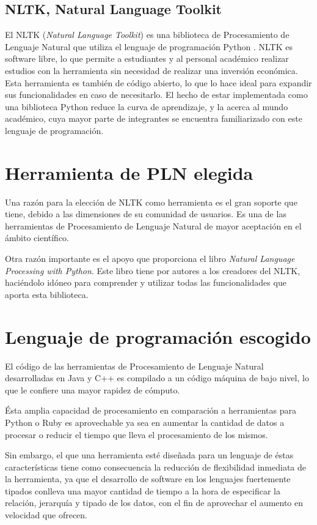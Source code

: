 \subsection{NLTK, Natural Language Toolkit}

El NLTK (\textit{Natural Language Toolkit}) es una biblioteca de Procesamiento de Lenguaje Natural que utiliza el lenguaje de programación Python \cite{bird09}.
%
NLTK es software libre, lo que permite a estudiantes y al personal académico realizar estudios con la herramienta sin necesidad de realizar una inversión económica.
%
Esta herramienta es también de código abierto, lo que lo hace ideal para expandir sus funcionalidades en caso de necesitarlo.
%
El hecho de estar implementada como una biblioteca Python reduce la curva de aprendizaje, y la acerca al mundo académico, cuya mayor parte de integrantes se encuentra familiarizado con este lenguaje de programación.

\label{chosen-nlp-tool}
\section{Herramienta de PLN elegida}

Una razón para la elección de NLTK como herramienta es el gran soporte que tiene, debido a las dimensiones de su comunidad de usuarios. Es una de las herramientas de Procesamiento de Lenguaje Natural de mayor aceptación en el ámbito científico.

Otra razón importante es el apoyo que proporciona el libro \textit{Natural Language Processing with Python}\cite{nltk-book}. Este libro tiene por autores a los creadores del NLTK, haciéndolo idóneo para comprender y utilizar todas las funcionalidades que aporta esta biblioteca.

\section{Lenguaje de programación escogido}

El código de las herramientas de Procesamiento de Lenguaje Natural desarrolladas en Java y C++ es compilado a un código máquina de bajo nivel, lo que le confiere una mayor rapidez de cómputo.

Ésta amplia capacidad de procesamiento en comparación a herramientas para Python o Ruby es aprovechable ya sea en aumentar la cantidad de datos a procesar o reducir el tiempo que lleva el procesamiento de los mismos.

Sin embargo, el que una herramienta esté diseñada para un lenguaje de éstas características tiene como consecuencia la reducción de flexibilidad inmediata de la herramienta, ya que el desarrollo de software en los lenguajes fuertemente tipados conlleva una mayor cantidad de tiempo a la hora de especificar la relación, jerarquía y tipado de los datos, con el fin de aprovechar el aumento en velocidad que ofrecen.

